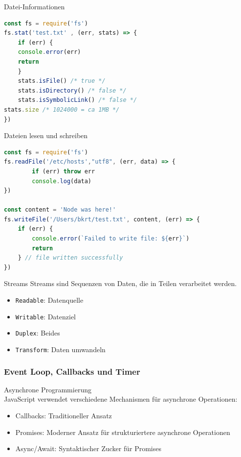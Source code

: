 \begin{examplecode}{Datei-Informationen}
\begin{lstlisting}[language=JavaScript, style=basesmol]
const fs = require('fs')
fs.stat('test.txt' , (err, stats) => {
    if (err) {
    console.error(err)
    return
    }
    stats.isFile() /* true */
    stats.isDirectory() /* false */
    stats.isSymbolicLink() /* false */
stats.size /* 1024000 = ca 1MB */
})
\end{lstlisting}
\end{examplecode}

\begin{examplecode}{Dateien lesen und schreiben}
\begin{lstlisting}[language=JavaScript, style=basesmol]
const fs = require('fs')
fs.readFile('/etc/hosts',"utf8", (err, data) => {
        if (err) throw err
        console.log(data)
})

const content = 'Node was here!'
fs.writeFile('/Users/bkrt/test.txt', content, (err) => {
    if (err) {
        console.error(`Failed to write file: ${err}`)
        return
    } // file written successfully
})
\end{lstlisting}
\end{examplecode}

\begin{definition}{Streams}
    Streams sind Sequenzen von Daten, die in Teilen verarbeitet werden.
    \begin{itemize}
        \item \texttt{Readable}: Datenquelle
        \item \texttt{Writable}: Datenziel
        \item \texttt{Duplex}: Beides
        \item \texttt{Transform}: Daten umwandeln
    \end{itemize}
\end{definition}

\subsubsection{Event Loop, Callbacks und Timer}

\begin{concept}{Asynchrone Programmierung}\\
    JavaScript verwendet verschiedene Mechanismen für asynchrone Operationen:
    \begin{itemize}
        \item Callbacks: Traditioneller Ansatz
        \item Promises: Moderner Ansatz für strukturiertere asynchrone Operationen
        \item Async/Await: Syntaktischer Zucker für Promises
    \end{itemize}
\end{concept}


